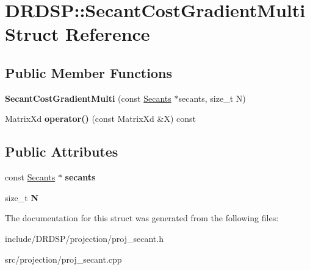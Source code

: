 \hypertarget{struct_d_r_d_s_p_1_1_secant_cost_gradient_multi}{\section{D\-R\-D\-S\-P\-:\-:Secant\-Cost\-Gradient\-Multi Struct Reference}
\label{struct_d_r_d_s_p_1_1_secant_cost_gradient_multi}
}
\subsection*{Public Member Functions}
\begin{DoxyCompactItemize}
\item 
\hypertarget{struct_d_r_d_s_p_1_1_secant_cost_gradient_multi_a4ca34beff67912da82ee2c38c3067b70}{{\bfseries Secant\-Cost\-Gradient\-Multi} (const \hyperlink{struct_d_r_d_s_p_1_1_secants}{Secants} $\ast$secants, size\-\_\-t N)}\label{struct_d_r_d_s_p_1_1_secant_cost_gradient_multi_a4ca34beff67912da82ee2c38c3067b70}

\item 
\hypertarget{struct_d_r_d_s_p_1_1_secant_cost_gradient_multi_ac5d9872ad2ea3cfaa093701147eb9e59}{Matrix\-Xd {\bfseries operator()} (const Matrix\-Xd \&X) const }\label{struct_d_r_d_s_p_1_1_secant_cost_gradient_multi_ac5d9872ad2ea3cfaa093701147eb9e59}

\end{DoxyCompactItemize}
\subsection*{Public Attributes}
\begin{DoxyCompactItemize}
\item 
\hypertarget{struct_d_r_d_s_p_1_1_secant_cost_gradient_multi_a2725c1b2c8c4ff707df7b9d62524a09e}{const \hyperlink{struct_d_r_d_s_p_1_1_secants}{Secants} $\ast$ {\bfseries secants}}\label{struct_d_r_d_s_p_1_1_secant_cost_gradient_multi_a2725c1b2c8c4ff707df7b9d62524a09e}

\item 
\hypertarget{struct_d_r_d_s_p_1_1_secant_cost_gradient_multi_a44b55a4bb3da9af972fa093a77e83662}{size\-\_\-t {\bfseries N}}\label{struct_d_r_d_s_p_1_1_secant_cost_gradient_multi_a44b55a4bb3da9af972fa093a77e83662}

\end{DoxyCompactItemize}


The documentation for this struct was generated from the following files\-:\begin{DoxyCompactItemize}
\item 
include/\-D\-R\-D\-S\-P/projection/proj\-\_\-secant.\-h\item 
src/projection/proj\-\_\-secant.\-cpp\end{DoxyCompactItemize}
